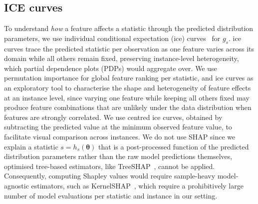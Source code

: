 \subsection{ICE curves}
\label{sec:ice_plots}

To understand \emph{how} a feature affects a statistic through the predicted distribution parameters, we use individual conditional expectation (\gls{ice}) curves~\citep{GolEtAl14} for $g_s$.
\Gls{ice} curves trace the predicted statistic per observation as one feature varies across its domain while all others remain fixed, preserving instance-level heterogeneity, which partial dependence plots (PDPs) would aggregate over.
We use permutation importance for global feature ranking per statistic, and \gls{ice} curves as an exploratory tool to characterise the shape and heterogeneity of feature effects at an instance level, since varying one feature while keeping all others fixed may produce feature combinations that are unlikely under the data distribution when features are strongly correlated. 
We use centred \gls{ice} curves, obtained by subtracting the predicted value at the minimum observed feature value, to facilitate visual comparison across instances.
We do not use SHAP since we explain a statistic $s = h_s(\boldsymbol\theta)$ that is a post-processed function of the predicted distribution parameters rather than the raw model predictions themselves, optimised tree-based estimators, like TreeSHAP~\citep{LunEtAl20}, cannot be applied. Consequently, computing Shapley values would require sample-heavy model-agnostic estimators, such as KernelSHAP~\citep{StrEtAl14}, which require a prohibitively large number of model evaluations per statistic and instance in our setting.


